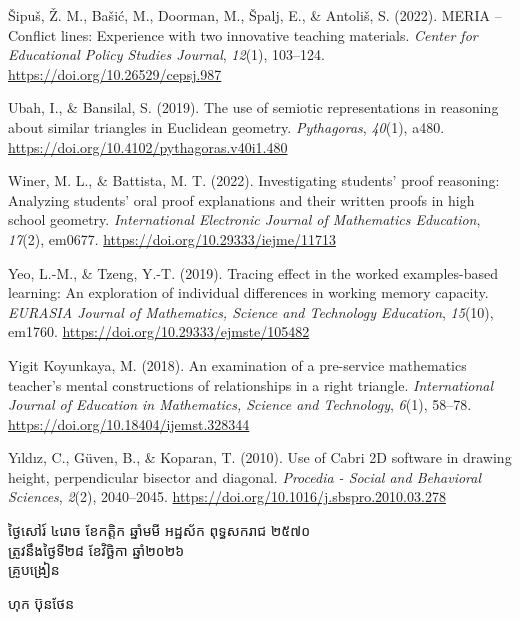 \documentclass[a4paper,12pt]{article}
\begin{document}
{\v{S}ipu\v{s}, \v{Z}. M., Ba\v{s}i\'c, M., Doorman, M., \v{S}palj, E., \& Antoli\v{s}, S. (2022). MERIA -- Conflict lines: Experience with two innovative teaching materials. \textit{Center for Educational Policy Studies Journal}, \textit{12}(1), 103--124. \url{https://doi.org/10.26529/cepsj.987}

Ubah, I., \& Bansilal, S. (2019). The use of semiotic representations in reasoning about similar triangles in Euclidean geometry. \textit{Pythagoras}, \textit{40}(1), a480. \url{https://doi.org/10.4102/pythagoras.v40i1.480}

Winer, M. L., \& Battista, M. T. (2022). Investigating students' proof reasoning: Analyzing students' oral proof explanations and their written proofs in high school geometry. \textit{International Electronic Journal of Mathematics Education}, \textit{17}(2), em0677. \url{https://doi.org/10.29333/iejme/11713}

Yeo, L.-M., \& Tzeng, Y.-T. (2019). Tracing effect in the worked examples-based learning: An exploration of individual differences in working memory capacity. \textit{EURASIA Journal of Mathematics, Science and Technology Education}, \textit{15}(10), em1760. \url{https://doi.org/10.29333/ejmste/105482}

Yigit Koyunkaya, M. (2018). An examination of a pre-service mathematics teacher's mental constructions of relationships in a right triangle. \textit{International Journal of Education in Mathematics, Science and Technology}, \textit{6}(1), 58--78. \url{https://doi.org/10.18404/ijemst.328344}

Y\i ld\i z, C., G\"uven, B., \& Koparan, T. (2010). Use of Cabri 2D software in drawing height, perpendicular bisector and diagonal. \textit{Procedia - Social and Behavioral Sciences}, \textit{2}(2), 2040--2045. \url{https://doi.org/10.1016/j.sbspro.2010.03.278}

\par}

\needspace{2.0cm}
\vspace{6pt}
\hfill
\begin{minipage}{10.2cm}
  {\centering
    ថ្ងៃសៅរ៍ ៤រោច ខែកត្តិក ឆ្នាំមមី អដ្ឋស័ក ពុទ្ធសករាជ ២៥៧០\\[2pt]
    ត្រូវនឹងថ្ងៃទី២៨ ខែវិច្ឆិកា ឆ្នាំ២០២៦\\[4pt]
    {\muol\fontsize{11.5pt}{18pt}\selectfont គ្រូបង្រៀន}\par}
  \vspace{32pt}
  \hfill{\muol\fontsize{11.5pt}{18pt}\selectfont ហុក ប៊ុនថែន}\hspace*{1.4cm}
\end{minipage}
\end{document}
